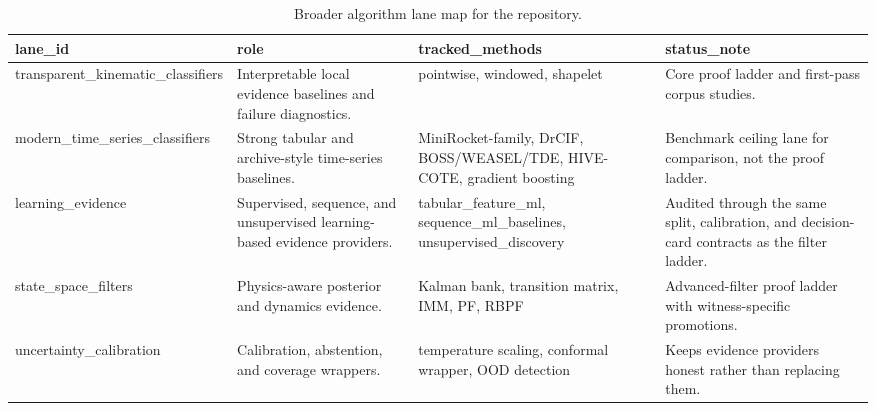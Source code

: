 \begin{table}[htbp]
\centering
\caption{Broader algorithm lane map for the repository.}
\label{tab:algorithm_lanes}
\begin{tabularx}{\textwidth}{lXXX}
\toprule
lane\_id & role & tracked\_methods & status\_note \\
\midrule
transparent\_kinematic\_classifiers & Interpretable local evidence baselines and failure diagnostics. & pointwise, windowed, shapelet & Core proof ladder and first-pass corpus studies. \\
modern\_time\_series\_classifiers & Strong tabular and archive-style time-series baselines. & MiniRocket-family, DrCIF, BOSS/WEASEL/TDE, HIVE-COTE, gradient boosting & Benchmark ceiling lane for comparison, not the proof ladder. \\
learning\_evidence & Supervised, sequence, and unsupervised learning-based evidence providers. & tabular\_feature\_ml, sequence\_ml\_baselines, unsupervised\_discovery & Audited through the same split, calibration, and decision-card contracts as the filter ladder. \\
state\_space\_filters & Physics-aware posterior and dynamics evidence. & Kalman bank, transition matrix, IMM, PF, RBPF & Advanced-filter proof ladder with witness-specific promotions. \\
uncertainty\_calibration & Calibration, abstention, and coverage wrappers. & temperature scaling, conformal wrapper, OOD detection & Keeps evidence providers honest rather than replacing them. \\
\bottomrule
\end{tabularx}
\end{table}